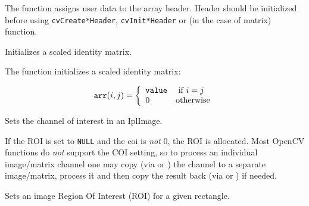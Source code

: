 \begin{description}
\end{description}

The function assigns user data to the array header. Header should be initialized before using \texttt{cvCreate*Header}, \texttt{cvInit*Header} or  (in the case of matrix) function.

Initializes a scaled identity matrix.


\begin{description}
\end{description}

The function initializes a scaled identity matrix:

\[
\texttt{arr}(i,j)=\left\{ \begin{array}{l l} \texttt{value} & \mbox{ if $i=j$}\\ 0 & \mbox{otherwise}\\ \end{array} \right.
\]

Sets the channel of interest in an IplImage.


\begin{description}
\end{description}

If the ROI is set to \texttt{NULL} and the coi is \textit{not} 0,
the ROI is allocated. Most OpenCV functions do \textit{not} support
the COI setting, so to process an individual image/matrix channel one
may copy (via  or ) the channel to a separate
image/matrix, process it and then copy the result back (via 
or ) if needed.

Sets an image Region Of Interest (ROI) for a given rectangle.


